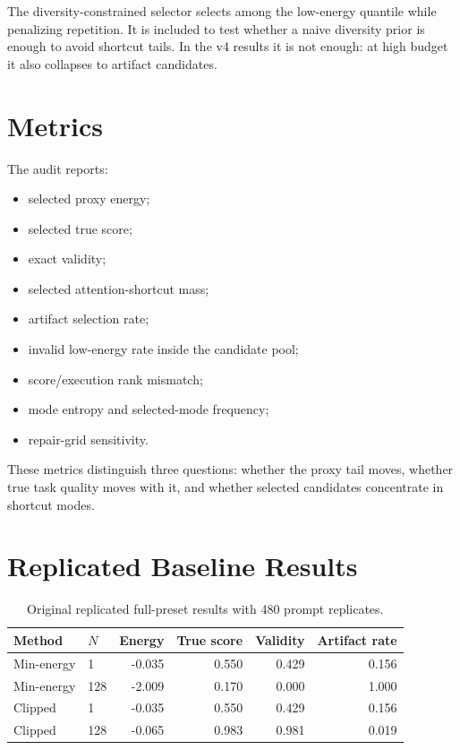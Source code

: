 \documentclass{article}
\begin{document}
The diversity-constrained selector selects among the low-energy quantile while
penalizing repetition. It is included to test whether a naive diversity prior
is enough to avoid shortcut tails. In the v4 results it is not enough: at high
budget it also collapses to artifact candidates.

\section{Metrics}

The audit reports:
\begin{itemize}
  \item selected proxy energy;
  \item selected true score;
  \item exact validity;
  \item selected attention-shortcut mass;
  \item artifact selection rate;
  \item invalid low-energy rate inside the candidate pool;
  \item score/execution rank mismatch;
  \item mode entropy and selected-mode frequency;
  \item repair-grid sensitivity.
\end{itemize}
These metrics distinguish three questions: whether the proxy tail moves, whether
true task quality moves with it, and whether selected candidates concentrate in
shortcut modes.

\section{Replicated Baseline Results}

\begin{table}[t]
\centering
\caption{Original replicated full-preset results with 480 prompt replicates.}
\label{tab:baseline}
\begin{tabular}{llrrrr}
\toprule
Method & $N$ & Energy & True score & Validity & Artifact rate \\
\midrule
Min-energy & 1 & -0.035 & 0.550 & 0.429 & 0.156 \\
Min-energy & 128 & -2.009 & 0.170 & 0.000 & 1.000 \\
Clipped & 1 & -0.035 & 0.550 & 0.429 & 0.156 \\
Clipped & 128 & -0.065 & 0.983 & 0.981 & 0.019 \\
\bottomrule
\end{tabular}
\end{table}
\end{document}
